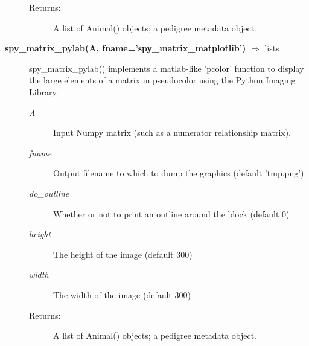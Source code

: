\begin{description}
\begin{description}
\item[Returns:] A list of Animal() objects; a pedigree metadata object.
\end{description}
\item[\textbf{spy\_matrix\_pylab(A, fname='spy\_matrix\_matplotlib')} $\Rightarrow$ lists]
spy\_matrix\_pylab() implements a matlab-like 'pcolor' function to display the large elements of a matrix in pseudocolor using the Python Imaging Library.
\begin{description}
\item[\emph{A}] Input Numpy matrix (such as a numerator relationship matrix).
\item[\emph{fname}] Output filename to which to dump the graphics (default 'tmp.png')
\item[\emph{do\_outline}] Whether or not to print an outline around the block (default 0)
\item[\emph{height}] The height of the image (default 300)
\item[\emph{width}] The width of the image (default 300)
\item[Returns:] A list of Animal() objects; a pedigree metadata object.
\end{description}
\end{description}
